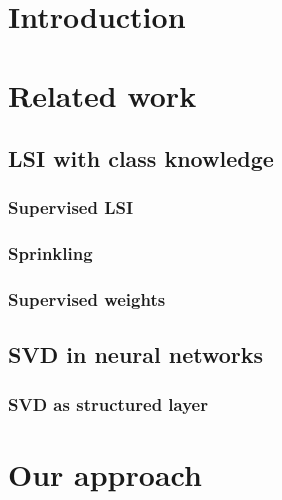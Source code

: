 \chapter*{Introduction}


{}


\chapter{Related work}
    \section{LSI with class knowledge}
        \subsection{Supervised LSI}
            \cite{sun2004supervised} %

        \subsection{Sprinkling}
            \cite{chakraborti2007supervised} %
        
        \subsection{Supervised weights} \label{sec:supervised:weights}
            \cite{wu2017balancing} %
            \cite{ji2013discriminative} %
            \cite{deng2014study} %
            \cite{lan2009supervised} %

    
    \section{SVD in neural networks}
        \subsection{SVD as structured layer} 
            \cite{ionescu2015training} %

    
\chapter{Our approach}
    

